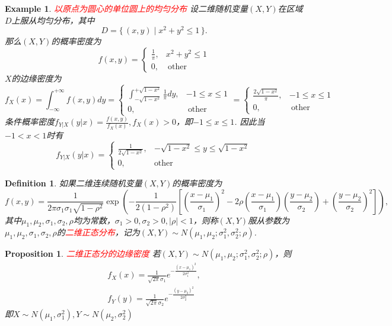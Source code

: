 \documentclass{article}
\newtheorem{proposition}[theorem]{Proposition}
\newtheorem{example}[theorem]{Example}
\newtheorem{definition}[theorem]{Definition}
\newcommand\Set[2]{\{\,#1\mid#2\,\}} %
\newcommand{\redt}[1]{\textcolor{red}{#1}}
\begin{document}
\begin{example}
\rm \redt{以原点为圆心的单位圆上的均匀分布} 设二维随机变量$(X,Y)$在区域$D$上服从均匀分布，其中
$$
D=\Set{(x,y)}{x^2 + y ^2 \leq 1}.
$$
那么$(X,Y)$的概率密度为
$$
f(x,y)=\left\{\begin{array}{ll}
\frac{1}{\pi}, & x^2 + y^2 \leq 1 \\
0, & ~\text{other}
\end{array}\right. 
$$
$X$的边缘密度为
$$
f_X(x) = \int_{-\infty}^{+\infty} f(x,y)dy = \left\{ \begin{array}{ll}
\int_{-\sqrt{1-x^2}}^{+\sqrt{1-x^2}} \frac{1}{\pi}dy, & -1 \leq x \leq 1\\
0, & ~\text{other} 
\end{array} \right. = \left\{\begin{array}{ll}
\frac{2\sqrt{1-x^2}}{\pi},& -1 \leq x \leq 1 \\
0, & ~\text{other}
\end{array} \right.
$$
条件概率密度$f_{Y|X}(y|x) = \frac{f(x,y)}{f_X(x)}, f_X(x) > 0$，即$-1 \leq x \leq 1$. 因此当$-1<x<1$时有
$$
f_{Y|X}(y|x) = \left\{\begin{array}{ll}
\frac{1}{2\sqrt{1-x^2}}, &  -\sqrt{1-x^2} \leq y \leq \sqrt{1-x^2} \\
0, & \text{other}
\end{array}\right.
$$
\end{example}

\begin{definition}
\rm  如果二维连续随机变量$(X,Y)$的概率密度为
\begin{equation}
f(x,y)={\frac {1}{2\pi \sigma _{1}\sigma _{1}{\sqrt {1-\rho ^{2}}}}}\mathrm \exp\left({-{\frac {1}{2(1-\rho ^{2})}}\left[\left({\frac {x-\mu _{1}}{\sigma _{1}}}\right)^{2}-2\rho \left({\frac {x-\mu _{1}}{\sigma _{1}}}\right)\left({\frac {y-\mu _{2}}{\sigma _{2}}}\right)+\left({\frac {y-\mu _{2}}{\sigma _{2}}}\right)^{2}\right]}\right),
\end{equation}
其中$\mu_1,\mu_2,\sigma_1,\sigma_2,\rho$均为常数，$\sigma_1 > 0,\sigma_2 > 0, |\rho| < 1$，则称$(X,Y)$服从参数为$\mu_1,\mu_2,\sigma_1,\sigma_2,\rho$的\redt{二维正态分布}，记为$(X,Y) \sim N(\mu_1,\mu_2;\sigma_1^2,\sigma_2^2; \rho)$. 
\end{definition}

\begin{proposition}
\rm \redt{二维正态分的边缘密度} 若$(X,Y) \sim N(\mu_1,\mu_2;\sigma_1^2,\sigma_2^2; \rho)$，则
$$
\begin{array}{ll}
f_X(x) = \frac{1}{\sqrt{2\pi}\sigma_1}e^{-\frac{(x-\mu_1)^2}{2\sigma_1^2}}, \\
f_Y(y) = \frac{1}{\sqrt{2\pi}\sigma_2}e^{-\frac{(y-\mu_2)^2}{2\sigma_2^2}}
\end{array}
$$
即$X \sim N(\mu_1,\sigma_1^2),Y \sim N(\mu_2,\sigma_2^2)$
\end{proposition}
\end{document}
